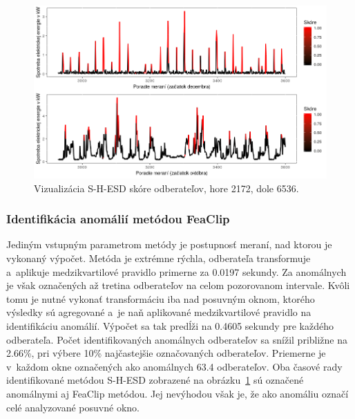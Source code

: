 \documentclass[a4paper,twoside,slovak,12pt,appendix]{article}
\begin{document}
\begin{figure}[htbp]
  \centering
  \includegraphics[width=\textwidth]{results_twitter.png}
  \caption[Vizualizácia S-H-ESD skóre odberateľov.]{Vizualizácia S-H-ESD skóre odberateľov, hore 2172, dole 6536.}
  \label{fig:results-twitter}
\end{figure}

\subsubsection{Identifikácia anomálií metódou FeaClip}
Jediným vstupným parametrom metódy je postupnosť meraní, nad ktorou je vykonaný
výpočet. Metóda je extrémne rýchla, odberateľa transformuje a~aplikuje
medzikvartilové pravidlo primerne za 0.0197 sekundy. Za anomálnych je však
označených až tretina odberateľov na celom pozorovanom intervale. Kvôli tomu je
nutné vykonať transformáciu iba nad posuvným oknom, ktorého výsledky sú
agregované a~je naň aplikované medzikvartilové pravidlo na identifikáciu
anomálií. Výpočet sa tak predĺži na 0.4605 sekundy pre každého odberateľa. Počet
identifikovaných anomálnych odberateľov sa snížil približne na 2.66\%, pri
výbere 10\% najčastejšie označovaných odberateľov. Priemerne je v~každom okne
označených ako anomálnych 63.4 odberateľov. Oba časové rady identifikované
metódou S-H-ESD zobrazené na obrázku~\ref{fig:results-twitter} sú označené
anomálnymi aj FeaClip metódou. Jej nevýhodou však je, že ako anomáliu označí
celé analyzované posuvné okno.

\newpage\null\thispagestyle{empty}\newpage

\end{document}
